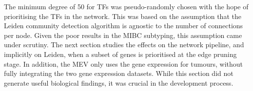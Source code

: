 The minimum degree of 50 for TFs was pseudo-randomly chosen with the hope of prioritising the TFs in the network. This was based on the assumption that the Leiden community detection algorithm is agnostic to the number of connections per node. Given the poor results in the MIBC subtyping, this assumption came under scrutiny. The next section studies the effects on the network pipeline, and implicitly on Leiden, when a subset of genes is prioritised at the edge pruning stage. In addition, the MEV only uses the gene expression for tumours, without fully integrating the two gene expression datasets. While this section did not generate useful biological findings, it was crucial in the development process.






